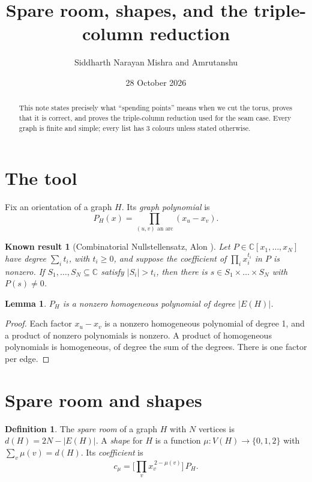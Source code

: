 \documentclass[11pt]{article}
\title{Spare room, shapes, and the triple-column reduction}
\author{Siddharth Narayan Mishra and Amrutanshu}
\date{28 October 2026}
\theoremstyle{plain}
\newtheorem{lemma}[theorem]{Lemma}
\newtheorem{known}[theorem]{Known result}
\theoremstyle{definition}
\newtheorem{definition}[theorem]{Definition}
\theoremstyle{remark}
\begin{document}
\maketitle

\begin{abstract}
This note states precisely what ``spending points'' means when we cut the torus, proves that it is
correct, and proves the triple-column reduction used for the seam case. Every graph is finite and
simple; every list has 3 colours unless stated otherwise.
\end{abstract}

\section{The tool}

Fix an orientation of a graph $H$. Its \emph{graph polynomial} is
\[ P_H(x) = \prod_{(u,v) \text{ an arc}} (x_u - x_v). \]

\begin{known}[Combinatorial Nullstellensatz, Alon \cite{Alon}]\label{cn}
Let $P \in \mathbb{C}[x_1,\dots,x_N]$ have degree $\sum_i t_i$, with $t_i \ge 0$, and suppose the coefficient
of $\prod_i x_i^{t_i}$ in $P$ is nonzero. If $S_1,\dots,S_N \subseteq \mathbb{C}$ satisfy $|S_i| > t_i$, then
there is $s \in S_1 \times \dots \times S_N$ with $P(s) \ne 0$.
\end{known}

\begin{lemma}\label{deg}
$P_H$ is a nonzero homogeneous polynomial of degree $|E(H)|$.
\end{lemma}

\begin{proof}
Each factor $x_u - x_v$ is a nonzero homogeneous polynomial of degree 1, and a product of nonzero
polynomials is nonzero. A product of homogeneous polynomials is homogeneous, of degree the sum of the
degrees. There is one factor per edge.
\end{proof}

\section{Spare room and shapes}

\begin{definition}
The \emph{spare room} of a graph $H$ with $N$ vertices is $d(H) = 2N - |E(H)|$. A \emph{shape} for $H$ is a
function $\mu : V(H) \to \{0, 1, 2\}$ with $\sum_v \mu(v) = d(H)$. Its \emph{coefficient} is
\[ c_\mu = \Big[\prod_{v} x_v^{\,2 - \mu(v)}\Big]\, P_H . \]
\end{definition}
\end{document}
